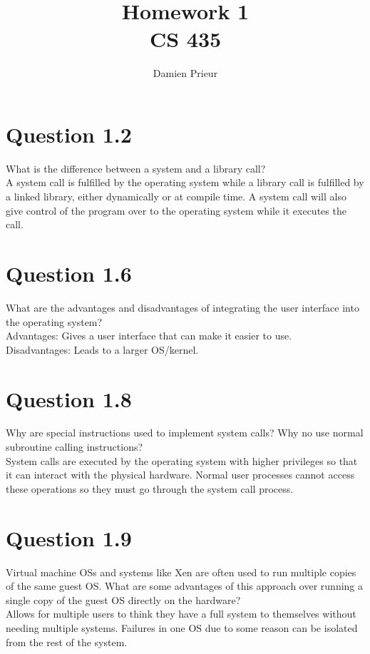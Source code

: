 \documentclass{article}
\author{Damien Prieur}
\title{Homework 1 \\ CS 435}
\date{}
\begin{document}
\maketitle

\section*{Question 1.2}
What is the difference between a system and a library call?
\\

A system call is fulfilled by the operating system while a library call is fulfilled by a linked library, either dynamically or at compile time.
A system call will also give control of the program over to the operating system while it executes the call.

\section*{Question 1.6}
What are the advantages and disadvantages of integrating the user interface into the operating system?
\\
Advantages: Gives a user interface that can make it easier to use.
\\
Disadvantages: Leads to a larger OS/kernel.

\section*{Question 1.8}
Why are special instructions used to implement system calls? Why no use normal subroutine calling instructions?
\\
System calls are executed by the operating system with higher privileges so that it can interact with the physical hardware.
Normal user processes cannot access these operations so they must go through the system call process.

\section*{Question 1.9}
Virtual machine OSs and systems like Xen are often used to run multiple copies of the same guest OS.
What are some advantages of this approach over running a single copy of the guest OS directly on the hardware?
\\
Allows for multiple users to think they have a full system to themselves without needing multiple systems.
Failures in one OS due to some reason can be isolated from the rest of the system.
\end{document}
